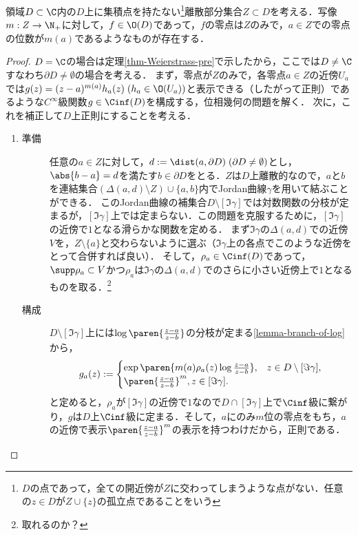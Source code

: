 \documentclass[uplatex, dvipdfmx]{jsreport}
\begin{document}
\begin{theorem}[Weierstrass]\label{thm-Weierstrass-zero}
    領域$D\subset\C$内の$D$上に集積点を持たない\footnote{$D$の点であって，全ての開近傍が$Z$に交わってしまうような点がない．任意の$z\in D$が$Z\cup\{z\}$の孤立点であることをいう}離散部分集合$Z\subset D$を考える．写像$m:Z\to\N_+$に対して，$f\in\O(D)$であって，$f$の零点は$Z$のみで，$a\in Z$での零点の位数が$m(a)$であるようなものが存在する．
\end{theorem}
\begin{proof}
    $D=\C$の場合は定理\ref{thm-Weierstrass-pre}で示したから，ここでは$D\ne\C$すなわち$\partial D\ne\emptyset$の場合を考える．
    まず，零点が$Z$のみで，各零点$a\in Z$の近傍$U_a$では$g(z)=(z-a)^{m(a)}h_a(z)\;(h_a\in\O(U_a))$と表示できる（したがって正則）であるような$C^\infty$級関数$g\in\Cinf(D)$を構成する，位相幾何の問題を解く．
    次に，これを補正して$D$上正則にすることを考える．
    \begin{enumerate}
        \item 
    \begin{description}
        \item[準備] 任意の$a\in Z$に対して，$d:=\dist(a,\partial D)\;(\partial D\ne\emptyset)$とし，$\abs{b-a}=d$を満たす$b\in\partial D$をとる．$Z$は$D$上離散的なので，$a$と$b$を連結集合$(\Delta(a,d)\setminus Z)\cup\{a,b\}$内でJordan曲線$\gamma$を用いて結ぶことができる．
        このJordan曲線の補集合$D\setminus[\Im\gamma]$では対数関数の分枝が定まるが，$[\Im\gamma]$上では定まらない．この問題を克服するために，$[\Im\gamma]$の近傍で$1$となる滑らかな関数を定める．
        まず$\Im\gamma$の$\Delta(a,d)$での近傍$V$を，$Z\setminus\{a\}$と交わらないように選ぶ（$\Im\gamma$上の各点でこのような近傍をとって合併すれば良い）．
        そして，$\rho_a\in\Cinf(D)$であって，$\supp\rho_a\subset V$かつ$\rho_a$は$\Im\gamma$の$\Delta(a,d)$でのさらに小さい近傍上で$1$となるものを取る．\footnote{取れるのか？}
        \item[構成]
        $D\setminus[\Im\gamma]$上には$\log\paren{\frac{z-a}{z-b}}$の分枝が定まる\ref{lemma-branch-of-log}から，
        \[g_a(z):=\begin{cases}
        \exp\paren{m(a)\rho_a(z)\log\frac{z-a}{z-b}},&z\in D\setminus[\Im\gamma],\\
        \paren{\frac{z-a}{z-b}}^m,z\in[\Im\gamma].
        \end{cases}\]
        と定めると，$\rho_a$が$[\Im\gamma]$の近傍で$1$なので$D\cap[\Im\gamma]$上で$\Cinf$級に繋がり，$g$は$D$上$\Cinf$級に定まる．そして，$a$にのみ$m$位の零点をもち，$a$の近傍で表示$\paren{\frac{z-a}{z-b}}^m$の表示を持つわけだから，正則である．

\end{description}
\end{enumerate}
\end{proof}
\end{document}
